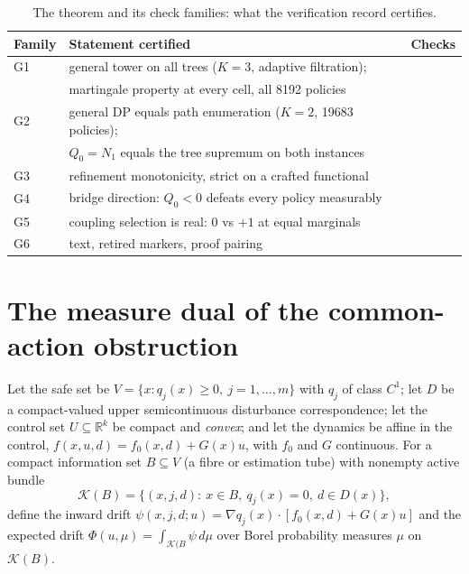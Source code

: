 \documentclass[10pt,twocolumn]{article}
\theoremstyle{definition}
\begin{document}
\begin{table}[h]
\centering\footnotesize
\caption{The theorem and its check families: what the verification record
certifies.}
\label{tab:checks}
\begin{tabular}{@{}l p{4.6cm} l@{}}
\toprule
Family & Statement certified & Checks \\
\midrule
G1 & general tower on all trees ($K{=}3$, adaptive filtration); & \\
   & martingale property at every cell, all 8192 policies & \\
G2 & general DP equals path enumeration ($K{=}2$, 19683 policies); & \\
   & $Q_0 = N_1$ equals the tree supremum on both instances & \\
G3 & refinement monotonicity, strict on a crafted functional & \\
G4 & bridge direction: $Q_0 < 0$ defeats every policy measurably & \\
G5 & coupling selection is real: $0$ vs $+1$ at equal marginals & \\
G6 & text, retired markers, proof pairing & \\
\bottomrule
\end{tabular}
\end{table}

\section{The measure dual of the common-action obstruction}

Let the safe set be $V = \{x: q_{j}(x) \ge 0,\ j = 1,\dots,m\}$ with
$q_{j}$ of class $C^{1}$; let $D$ be a compact-valued upper
semicontinuous disturbance correspondence; let the control set
$U \subseteq \mathbb{R}^{k}$ be compact and \emph{convex}; and let the
dynamics be affine in the control,
$f(x,u,d) = f_{0}(x,d) + G(x)u$, with $f_{0}$ and $G$ continuous. For a
compact information set $B \subseteq V$ (a fibre or estimation tube) with
nonempty active bundle
\[
\mathcal{K}(B) = \{(x,j,d):\ x \in B,\ q_{j}(x) = 0,\ d \in D(x)\},
\]
define the inward drift
$\psi(x,j,d;u) = \nabla q_{j}(x)\cdot[f_{0}(x,d) + G(x)u]$ and the
expected drift $\Phi(u,\mu) = \int_{\mathcal{K}(B} \psi \,d\mu$ over
Borel probability measures $\mu$ on $\mathcal{K}(B)$.
\end{document}
